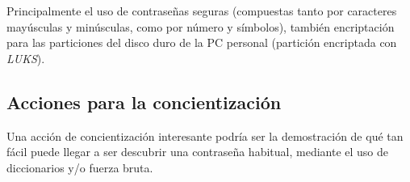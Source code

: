 Principalmente el uso de contraseñas seguras (compuestas tanto por caracteres mayúsculas y minúsculas, como por número y símbolos), también encriptación para las particiones del disco duro de la PC personal (partición encriptada con \emph{LUKS}).

\subsection{Acciones para la concientización}

Una acción de concientización interesante podría ser la demostración de qué tan fácil puede llegar a ser descubrir una contraseña habitual, mediante el uso de diccionarios y/o fuerza bruta.



















\clearpage
\printbibliography



